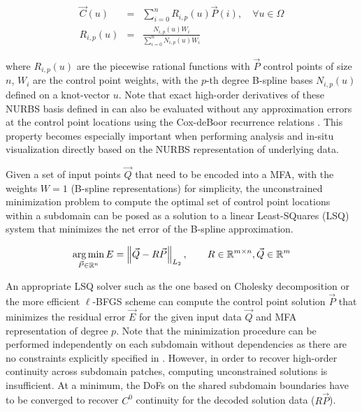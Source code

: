 \begin{eqnarray}
	\vec{C}(u) &=& \sum_{i=0}^{n} R_{i,p}(u) \vec{P}(i), \quad \forall u \in \Omega \\
	R_{i,p}(u) &=& \frac{N_{i,p}(u) W_i}{\sum_{i=0}^{n} N_{i,p}(u) W_i}
	\label{eq:nurbs-basis}
\end{eqnarray}

where $R_{i,p}(u)$ are the piecewise rational functions with $\vec{P}$ control points of size $n$, $W_i$ are the control point weights, with the $p$-th degree B-spline bases $N_{i,p}(u)$ defined on a knot-vector $u$. Note that exact high-order derivatives of these NURBS basis defined in  can also be evaluated without any approximation errors at the control point locations using the Cox-deBoor recurrence relations \cite{de1983approximation}. This property becomes especially important when performing analysis and in-situ visualization directly based on the NURBS representation of underlying data.

Given a set of input points $\vec{Q}$ that need to be encoded into a MFA, with the weights $W=1$ (B-spline representations) for simplicity, the unconstrained minimization problem to compute the optimal set of control point locations within a subdomain can be posed as a solution to a linear Least-SQuares (LSQ) system that minimizes the net error of the B-spline approximation.

\begin{eqnarray}
	\argmin_{\vec{P} \in \mathbb{R}^n} {E} = \left\lVert \vec{Q} - R \vec{P} \right\rVert_{L_2}, \quad \quad R \in \mathbb{R}^{m \times n}, \vec{Q} \in \mathbb{R}^m
	\label{eq:minimization-problem}
\end{eqnarray}

An appropriate LSQ solver such as the one based on Cholesky decomposition or the more efficient $\ell$-BFGS scheme \cite{zheng-bo-bspline-bfgs} can compute the control point solution $\vec{P}$ that minimizes the residual error $\vec{E}$ for the given input data $\vec{Q}$ and MFA representation of degree $p$. Note that the minimization procedure can be performed independently on each subdomain without dependencies as there are no constraints explicitly specified in .
%
However, in order to recover high-order continuity across subdomain patches, computing unconstrained solutions is insufficient. At a minimum, the DoFs on the shared subdomain boundaries have to be converged to recover $C^0$ continuity for the decoded solution data ($R \vec{P}$).
%


